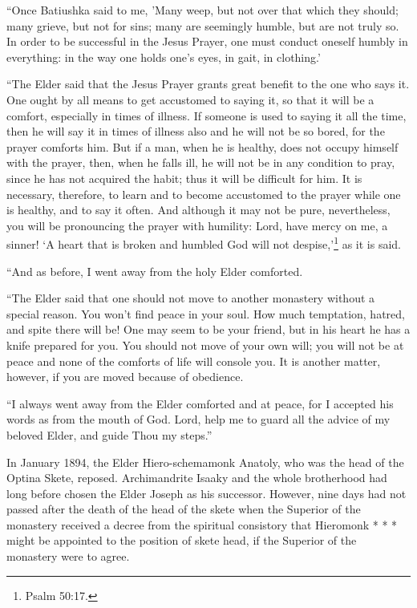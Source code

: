 “Once Batiushka said to me, 'Many weep, but not over that which they should; many grieve, but not for sins; many are seemingly humble, but are not truly so. In order to be successful in the Jesus Prayer, one must conduct oneself humbly in everything: in the way one holds one's eyes, in gait, in clothing.'

“The Elder said that the Jesus Prayer grants great benefit to the one who says it. One ought by all means to get accustomed to saying it, so that it will be a comfort, especially in times of illness. If someone is used to saying it all the time, then he will say it in times of illness also and he will not be so bored, for the prayer comforts him. But if a man, when he is healthy, does not occupy himself with the prayer, then, when he falls ill, he will not be in any condition to pray, since he has not acquired the habit; thus it will be difficult for him. It is necessary, therefore, to learn and to become accustomed to the prayer while one is healthy, and to say it often. And although it may not be pure, nevertheless, you will be pronouncing the prayer with humility: Lord, have mercy on me, a sinner! ‘A heart that is broken and humbled God will not despise,'\footnote{Psalm 50:17.} as it is said.

“And as before, I went away from the holy Elder comforted.

“The Elder said that one should not move to another monastery without a special reason. You won't find peace in your soul. How much temptation, hatred, and spite there will be! One may seem to be your friend, but in his heart he has a knife prepared for you. You should not move of your own will; you will not be at peace and none of the comforts of life will console you. It is another matter, however, if you are moved because of obedience.

“I always went away from the Elder comforted and at peace, for I accepted his words as from the mouth of God. Lord, help me to guard all the advice of my beloved Elder, and guide Thou my steps.”

\vspace*{.75cm}

In January 1894, the Elder Hiero-schemamonk Anatoly, who was the head of the Optina Skete, reposed. Archimandrite Isaaky and the whole brotherhood had long before chosen the Elder Joseph as his successor. However, nine days had not passed after the death of the head of the skete when the Superior of the monastery received a decree from the spiritual consistory that Hieromonk * * * might be appointed to the position of skete head, if the Superior of the monastery were to agree.

